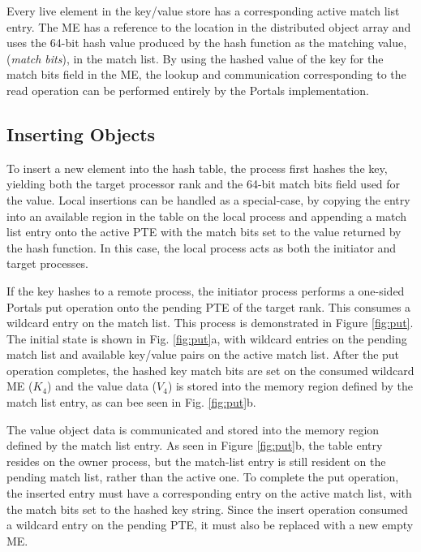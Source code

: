 Every live element in the key/value store has a corresponding active match list
entry. The ME has a reference to the location in the distributed object array
and uses the 64-bit hash value produced by the hash function as the matching
value, ({\em match bits}), in the match list. By using the hashed value of the
key for the match bits field in the ME, the lookup and communication
corresponding to the read operation can be performed entirely by the Portals
implementation.



%

 

\subsection{Inserting Objects}

To insert a new element into the hash table, the process first hashes the key,
yielding both the target processor rank and the 64-bit match bits field used for
the value. Local insertions can be handled as a special-case, by copying the entry
into an available region in the table on the local process and appending a
match list entry onto the active PTE with the match bits set to the value
returned by the hash function. In this case, the local process acts as both 
the initiator and target processes.

If the key hashes to a remote process, the initiator process performs a
one-sided Portals put operation onto the pending PTE of the target rank. This
consumes a wildcard entry on the match list. This process is demonstrated in
Figure \ref{fig:put}. The initial state is shown in Fig. \ref{fig:put}a, with
wildcard entries on the pending match list and available key/value pairs on the
active match list. After the put operation completes, the hashed key match bits
are set on the consumed wildcard ME ($K_4$) and the value data ($V_4$) is
stored into the memory region defined by the match list entry, as can bee seen
in Fig. \ref{fig:put}b.

The value object data is communicated and stored into the memory region defined
by the match list entry. As seen in Figure \ref{fig:put}b, the table entry
resides on the owner process, but the match-list entry is still resident on the
pending match list, rather than the active one. To complete the put operation,
the inserted entry must have a corresponding entry on the active match list,
with the match bits set to the hashed key string. Since the insert operation
consumed a wildcard entry on the pending PTE, it must also be replaced with a
new empty ME.

